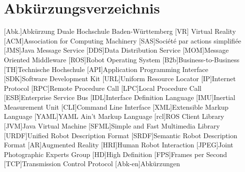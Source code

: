 
\chapter*{Abkürzungsverzeichnis}                   %

\begin{acronym}[DHBW]
  [Abk.]{Abkürzung}
   {Duale Hochschule Baden-Württemberg}
   [VR] {Virtual Reality}
  [ACM]{Association for Computing Machinery}
  [SAS]{Société par actions simplifiée}
  [JMS]{Java Message Service}
  [DDS]{Data Distribution Service}
  [MOM]{Message Oriented Middleware}
  [ROS]{Robot Operating System}
  [B2b]{Business-to-Business}
  [TH]{Technische Hochschule}
  [API]{Application Programming Interface}
  [SDK]{Software Development Kit}
  [URL]{Uniform Resource Locator}
  [IP]{Internet Protocol}
  [RPC]{Remote Procedure Call}
  [LPC]{Local Procedure Call}
  [ESB]{Enterprise Service Bus}
  [IDL]{Interface Definition Language}
  [IMU]{Inertial Measurement Unit}
  [CLI]{Command Line Interface}
  [XML]{Extensible Markup Language}
  [YAML]{YAML Ain't Markup Language}
  [rcl]{ROS Client Library}
  [JVM]{Java Virtual Machine}
  [SFML]{Simple and Fast Multimedia Library}
  [URDF]{Unified Robot Description Format}
  [SRDF]{Semantic Robot Description Format}
  [AR]{Augmented Reality}
  [HRI]{Human Robot Interaction}
  [JPEG]{Joint Photographic Experts Group}
  [HD]{High Definition}
  [FPS]{Frames per Second}
  [TCP]{Transmission Control Protocol}
  [Abk-en]{Abkürzungen}
\end{acronym}
